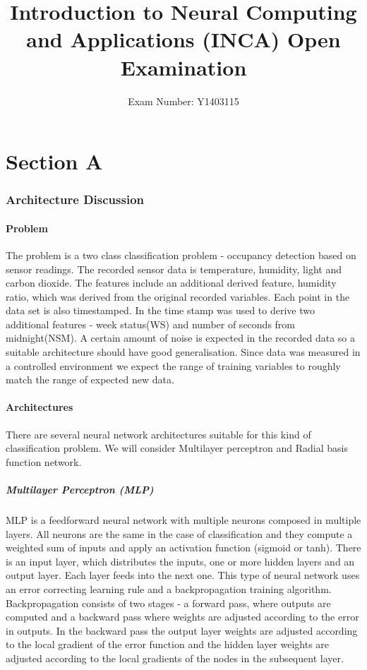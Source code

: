 \documentclass[a4paper, 11pt]{article}
\begin{document}
\title{Introduction to Neural Computing and Applications (INCA)
Open Examination}
\author{Exam Number: Y1403115}
\date{}
\maketitle


\part*{Section A}
\section{Architecture Discussion}

\subsection{Problem}
The problem is a two class classification problem - occupancy detection based on sensor readings. The recorded sensor data is temperature, humidity, light and carbon dioxide. The features include an additional derived feature, humidity ratio, which was derived from the original recorded variables. Each point in the data set is also timestamped. In \cite{Candanedo2016} the time stamp was used to derive two additional features - week status(WS) and number of seconds from midnight(NSM).
A certain amount of noise is expected in the recorded data so a suitable architecture should have good generalisation. Since data was measured in a controlled environment we expect the range of training variables to roughly match the range of expected new data.

\subsection{Architectures}
There are several neural network architectures suitable for this kind of classification problem. We will consider Multilayer perceptron and Radial basis function network. 
\subsubsection{Multilayer Perceptron (MLP)}
MLP is a feedforward neural network with multiple neurons composed in multiple layers. All neurons are the same in the case of classification and they compute a weighted sum of inputs and apply an activation function (sigmoid or tanh). There is an input layer, which distributes the inputs, one or more hidden layers and an output layer. Each layer feeds into the next one. This type of neural network uses an error correcting learning rule and a backpropagation training algorithm. Backpropagation consists of two stages - a forward pass, where outputs are computed and a backward pass where weights are adjusted according to the error in outputs. In the backward pass the output layer weights are adjusted according to the local gradient of the error function and the hidden layer weights are adjusted according to the local gradients of the nodes in the subsequent layer. 
\end{document}
